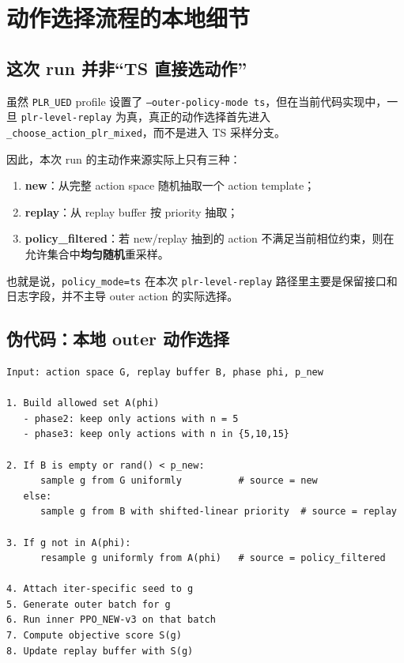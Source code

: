 \documentclass[11pt,a4paper]{ctexart}
\begin{document}
\section{动作选择流程的本地细节}

\subsection{这次 run 并非“TS 直接选动作”}
虽然 \texttt{PLR\_UED} profile 设置了 \texttt{--outer-policy-mode ts}，但在当前代码实现中，一旦 \texttt{plr-level-replay} 为真，真正的动作选择首先进入 \texttt{\_choose\_action\_plr\_mixed}，而不是进入 TS 采样分支。

因此，本次 run 的主动作来源实际上只有三种：
\begin{enumerate}[leftmargin=2.2em,itemsep=0.2em]
    \item \textbf{new}：从完整 action space 随机抽取一个 action template；
    \item \textbf{replay}：从 replay buffer 按 priority 抽取；
    \item \textbf{policy\_filtered}：若 new/replay 抽到的 action 不满足当前相位约束，则在允许集合中\textbf{均匀随机}重采样。
\end{enumerate}

也就是说，\texttt{policy\_mode=ts} 在本次 \texttt{plr-level-replay} 路径里主要是保留接口和日志字段，并不主导 outer action 的实际选择。

\subsection{伪代码：本地 outer 动作选择}
\begin{lstlisting}
Input: action space G, replay buffer B, phase phi, p_new

1. Build allowed set A(phi)
   - phase2: keep only actions with n = 5
   - phase3: keep only actions with n in {5,10,15}

2. If B is empty or rand() < p_new:
      sample g from G uniformly          # source = new
   else:
      sample g from B with shifted-linear priority  # source = replay

3. If g not in A(phi):
      resample g uniformly from A(phi)   # source = policy_filtered

4. Attach iter-specific seed to g
5. Generate outer batch for g
6. Run inner PPO_NEW-v3 on that batch
7. Compute objective score S(g)
8. Update replay buffer with S(g)
\end{lstlisting}
\end{document}
